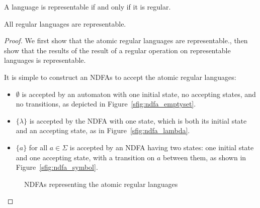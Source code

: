 \documentclass{bcthesis}
\begin{document}
\label{ch:kleenes_theorem}

	\begin{theorem}
		A language is representable if and only if it is regular.
	\end{theorem}

	\begin{claim}
	\label{prop:regular_languages_representable}
		All regular languages are representable.
	\end{claim}
	\begin{proof}
		We first show that the atomic regular languages are representable., then show that the results of the result of a regular operation on representable languages is representable.

		It is simple to construct an NDFAs to accept the atomic regular languages:
		\begin{itemize}
			\item [] $\emptyset$ is accepted by an automaton with one initial state, no accepting states, and no transitions, as depicted in Figure~\ref{sfig:ndfa_emptyset}.
			\item [] $\{ \lambda \}$ is accepted by the NDFA with one state, which is both its initial state and an accepting state, as in Figure~\ref{sfig:ndfa_lambda}.
			\item [] $\{ a \}$ for all $a \in \Sigma$ is accepted by an NDFA having two states: one initial state and one accepting state, with a transition on $a$ between them, as shown in Figure~\ref{sfig:ndfa_symbol}.
		\end{itemize}


		\begin{figure}[H]
			\centering
			\setlength{\fboxrule}{0 pt}
			\caption{NDFAs representing the atomic regular languages}
			\label{fig:ndfa_atomic_regular_languages}
		\end{figure}


\end{proof}
\end{document}
